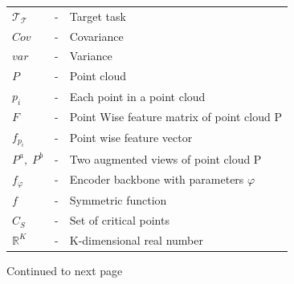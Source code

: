 \begin{table}[H]
\begin{tabular}{|p{70pt}|p{30pt}|p{350pt}|}
      $ \mathit{\mathcal{T_T}}$ & - & Target task \\
      $ \mathit{Cov}$ & - & Covariance \\
      $ \mathit{var}$ & - & Variance \\
      $ P$ & - & Point cloud \\
      $p_i$ & - & Each point in a point cloud \\
      $F$ & - & Point Wise feature matrix of point cloud P \\
      $f_{p_i}$ & - & Point wise feature vector \\
      $ P^a, \; P^b$ & -& Two augmented views of point cloud P \\
      $f_{\varphi}$ & - & Encoder backbone with parameters $\varphi$ \\
      $\mathit{f}$ & - & Symmetric function \\
      $\mathit{C_S}$ & - & Set of critical points \\
      $ \mathbb{R}^\mathit{K}$ & - & K-dimensional real number \\
      \bottomrule
    \end{tabular}
\end{table}
\begin{flushright}
  Continued to next page
\end{flushright}

